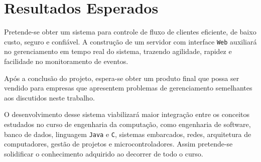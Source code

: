 \chapter[Resultados Esperados]{Resultados Esperados}

Pretende-se obter um sistema para controle de fluxo de clientes eficiente, de baixo custo, seguro e confiável. A construção de um servidor 
com interface \texttt{Web} auxiliará no gerenciamento em tempo real do sistema, trazendo agilidade, rapidez e facilidade no monitoramento de eventos.

Após a conclusão do projeto, espera-se obter um produto final que possa ser vendido para empresas que apresentem problemas de gerenciamento
semelhantes aos discutidos neste trabalho.

O desenvolvimento desse sistema viabilizará maior integração entre os conceitos estudados no curso de engenharia da computação, como engenharia de 
software, banco de dados, linguagem \texttt{Java} e \texttt{C}, sistemas embarcados, redes, arquitetura de computadores, gestão de projetos e microcontroladores. 
Assim pretende-se solidificar o conhecimento adquirido ao decorrer de todo o curso.




